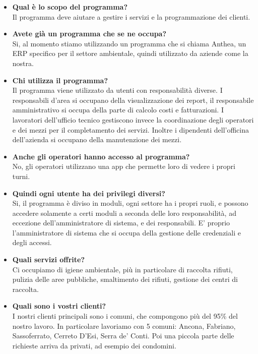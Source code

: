 \documentclass[green, fancy, 11pt]{elegantbook}
\begin{document}
\begin{itemize}
	\item \textbf{Qual è lo scopo del programma?}\\
	Il programma deve aiutare a gestire i servizi e la programmazione dei clienti.
	
	\item \textbf{Avete già un programma che se ne occupa?}\\
	Si, al momento stiamo utilizzando un programma che si chiama Anthea, un ERP specifico per il settore ambientale, quindi utilizzato da aziende come la nostra.
	
	\item \textbf{Chi utilizza il programma?}\\
	Il programma viene utilizzato da utenti con responsabilità diverse. I responsabili d'area si occupano
	della visualizzazione dei report, il responsabile amministrativo si occupa della parte di calcolo costi e fatturazioni. I lavoratori dell'ufficio tecnico gestiscono invece la coordinazione degli operatori e dei mezzi per il completamento dei servizi. Inoltre i dipendenti dell'officina dell'azienda si occupano della manutenzione dei mezzi.
	
	\item \textbf{Anche gli operatori hanno accesso al programma?}\\
	No, gli operatori utilizzano una app che permette loro di vedere i propri turni.
	
	\item \textbf{Quindi ogni utente ha dei privilegi diversi?}\\
	Si, il programma è diviso in moduli, ogni settore ha i propri ruoli, e possono accedere solamente a
	certi moduli a seconda delle loro responsabilità, ad eccezione dell'amministratore di sistema, e dei responsabili.
	E' proprio l'amministratore di sistema che si occupa della gestione delle credenziali e degli accessi.
	
	\item \textbf{Quali servizi offrite?}\\
	Ci occupiamo di igiene ambientale, più in particolare di raccolta rifiuti, pulizia delle aree pubbliche, smaltimento dei rifiuti, gestione dei centri di raccolta.
	
	\item \textbf{Quali sono i vostri clienti?}\\
	I nostri clienti principali sono i comuni, che compongono più del 95\% del nostro lavoro. In particolare lavoriamo
	con 5 comuni: Ancona, Fabriano, Sassoferrato, Cerreto D'Esi, Serra de' Conti. Poi una piccola parte delle richieste
	arriva da privati, ad esempio dei condomini.
	

\end{itemize}
\end{document}
